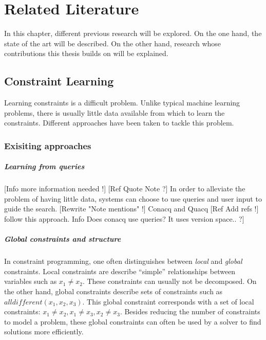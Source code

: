 \chapter{Related Literature}
\label{cha:rellit}

In this chapter, different previous research will be explored.
On the one hand, the state of the art will be described.
On the other hand, research whose contributions this thesis builds on will be explained.

\section{Constraint Learning}
Learning constraints is a difficult problem.
Unlike typical machine learning problems, there is usually little data available from which to learn the constraints.
Different approaches have been taken to tackle this problem.

\subsection{Exisiting approaches}
\paragraph{Learning from queries}
[Info more information needed !] [Ref Quote Note ?]
In order to alleviate the problem of having little data, systems can choose to use queries and user input to guide the search.
[Rewrite "Note mentions" !] Conacq and Quacq [Ref Add refs !] follow this approach. 
Info Does conacq use queries? It uses version space.. ?]

\paragraph{Global constraints and structure}
In constraint programming, one often distinguishes between \textit{local} and \textit{global} constraints.
Local constraints are describe ``simple'' relationships between variables such as $x_1 \neq x_2$.
These constraints can usually not be decomposed.
On the other hand, global constraints describe sets of constraints such as $\mathit{alldifferent}(x_1, x_2, x_3)$.
This global constraint corresponds with a set of local constraints: $x_1 \neq x_2, x_1 \neq x_3, x_2 \neq x_3$.
Besides reducing the number of constraints to model a problem, these global constraints can often be used by a solver to find solutions more efficiently.

